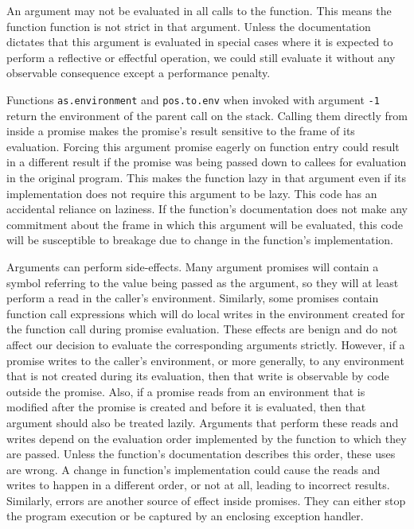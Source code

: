 \documentclass[review,nonacm,screen,acmsmall,anonymous=true]{acmart}
\newcommand{\code}[1]{\lstinline[style=R]|#1|\xspace}
\begin{document}
An argument may not be evaluated in all calls to the function. This means the
function function is not strict in that argument. Unless the documentation
dictates that this argument is evaluated in special cases where it is expected
to perform a reflective or effectful operation, we could still evaluate it
without any observable consequence except a performance penalty.

Functions \code{as.environment} and \code{pos.to.env} when invoked with argument
\code{-1} return the environment of the parent call on the stack. Calling them
directly from inside a promise makes the promise's result sensitive to the frame
of its evaluation. Forcing this argument promise eagerly on function entry could
result in a different result if the promise was being passed down to callees for
evaluation in the original program. This makes the function lazy in that
argument even if its implementation does not require this argument to be lazy.
This code has an accidental reliance on laziness. If the function's
documentation does not make any commitment about the frame in which this
argument will be evaluated, this code will be susceptible to breakage due to
change in the function's implementation.

Arguments can perform side-effects. Many argument promises will contain a symbol
referring to the value being passed as the argument, so they will at least
perform a read in the caller's environment. Similarly, some promises contain
function call expressions which will do local writes in the environment created
for the function call during promise evaluation. These effects are benign and do
not affect our decision to evaluate the corresponding arguments strictly.
However, if a promise writes to the caller's environment, or more generally, to
any environment that is not created during its evaluation, then that write is
observable by code outside the promise. Also, if a promise reads from an
environment that is modified after the promise is created and before it is
evaluated, then that argument should also be treated lazily. Arguments that
perform these reads and writes depend on the evaluation order implemented by the
function to which they are passed. Unless the function's documentation describes
this order, these uses are wrong. A change in function's implementation could
cause the reads and writes to happen in a different order, or not at all,
leading to incorrect results. Similarly, errors are another source of effect
inside promises. They can either stop the program execution or be captured by an
enclosing exception handler.
\end{document}
